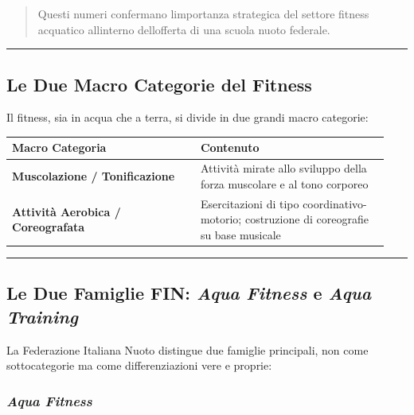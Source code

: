 \documentclass[a4paper,11pt]{article}
\begin{document}
\begin{quote}
      Questi numeri confermano l\textquotesingle importanza strategica del
      settore fitness acquatico all\textquotesingle interno
      dell\textquotesingle offerta di una scuola nuoto federale.
\end{quote}

\begin{center}\rule{0.5\linewidth}{0.5pt}\end{center}

\subsection{Le Due Macro Categorie del
      Fitness}\label{le-due-macro-categorie-del-fitness}

Il fitness, sia in acqua che a terra, si divide in due grandi macro
categorie:

\begin{longtable}[]{@{}p{0.47\linewidth}p{0.47\linewidth}@{}}
      \toprule\noalign{}
      Macro Categoria                           & Contenuto                     \\
      \midrule\noalign{}
      \endhead
      \bottomrule\noalign{}
      \endlastfoot
      \textbf{Muscolazione / Tonificazione}     & Attività mirate allo sviluppo
      della forza muscolare e al tono corporeo                                  \\
      \textbf{Attività Aerobica / Coreografata} & Esercitazioni di tipo
      coordinativo-motorio; costruzione di coreografie su base musicale         \\
\end{longtable}

\begin{center}\rule{0.5\linewidth}{0.5pt}\end{center}

\subsection{\texorpdfstring{Le Due Famiglie FIN: \emph{Aqua Fitness} e
            \emph{Aqua
                  Training}}{Le Due Famiglie FIN: Aqua Fitness e Aqua Training}}\label{le-due-famiglie-fin-aqua-fitness-e-aqua-training}

La Federazione Italiana Nuoto distingue due famiglie principali, non
come sottocategorie ma come differenziazioni vere e proprie:

\subsubsection{\texorpdfstring{\emph{Aqua
                  Fitness}}{Aqua Fitness}}\label{aqua-fitness}
\end{document}
